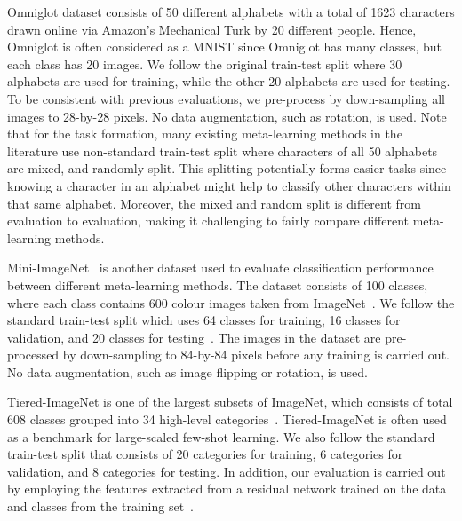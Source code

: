 	    Omniglot dataset consists of 50 different alphabets with a total of 1623 characters drawn online via Amazon's Mechanical Turk by 20 different people. Hence, Omniglot is often considered as a  MNIST since Omniglot has many classes, but each class has 20 images. We follow the original train-test split where 30 alphabets are used for training, while the other 20 alphabets are used for testing. To be consistent with previous evaluations, we pre-process by down-sampling all images to 28-by-28 pixels. No data augmentation, such as rotation, is used. Note that for the task formation, many existing meta-learning methods in the literature use non-standard train-test split where characters of all 50 alphabets are mixed, and randomly split. This splitting potentially forms easier tasks since knowing a character in an alphabet might help to classify other characters within that same alphabet. Moreover, the mixed and random split is different from evaluation to evaluation, making it challenging to fairly compare different meta-learning methods.
        
        Mini-ImageNet~\cite{vinyals2016matching} is another dataset used to evaluate classification performance between different meta-learning methods. The dataset consists of 100 classes, where each class contains 600 colour images taken from ImageNet~\cite{ILSVRC15}. We follow the standard train-test split which uses 64 classes for training, 16 classes for validation, and 20 classes for testing~\cite{ravi2017optimization}. The images in the dataset are pre-processed by down-sampling to 84-by-84 pixels before any training is carried out. No data augmentation, such as image flipping or rotation, is used.
        
        Tiered-ImageNet is one of the largest subsets of ImageNet, which consists of total 608 classes grouped into 34 high-level categories~\cite{ren2018meta}. Tiered-ImageNet is often used as a benchmark for large-scaled few-shot learning. We also follow the standard train-test split that consists of 20 categories for training, 6 categories for validation, and 8 categories for testing. In addition, our evaluation is carried out by employing the features extracted from a residual network trained on the data and classes from the training set~\cite{rusu2019meta}.

